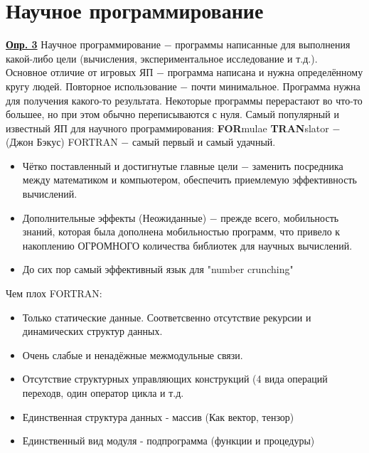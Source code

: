 \documentclass[a4paper, 12pt, titlepage, finall]{extreport}
\begin{document}
        \section{Научное программирование}
            \underline{\bf Опр. 3} Научное программирование $-$ программы написанные для выполнения какой-либо цели (вычисления, экспериментальное исследование и т.д.).\\
            Основное отличие от игровых ЯП $-$ программа написана и нужна определённому кругу людей. Повторное использование $-$ почти минимальное.
            Программа нужна для получения какого-то результата. Некоторые программы перерастают во что-то большее, но при этом обычно переписываются с нуля.
            Самый популярный и известный ЯП для научного программирования: \textbf{FOR}mulae \textbf{TRAN}slator $-$ (Джон Бэкус)
            FORTRAN $-$ самый первый и самый удачный.
            \begin{itemize}
                \item Чётко поставленный и достигнутые главные цели $-$ заменить посредника между математиком и компьютером, обеспечить приемлемую эффективность вычислений.
                \item Дополнительные эффекты (Неожиданные) $-$ прежде всего, мобильность знаний, которая была дополнена мобильностью программ, 
                что привело к накоплению ОГРОМНОГО количества библиотек для научных вычислений.
                \item До сих пор самый эффективный язык для "number crunching"
            \end{itemize}
            Чем плох FORTRAN:
            \begin{itemize}
                \item Только статические данные. Соответсвенно отсутствие рекурсии и динамических структур данных.
                \item Очень слабые и ненадёжные межмодульные связи.
                \item Отсутствие структурных управляющих конструкций (4 вида операций переходв, один оператор цикла и т.д.
                \item Единственная структура данных - массив (Как вектор, тензор)
                \item Единственный вид модуля - подпрограмма (функции и процедуры)
            \end{itemize}
\end{document}
